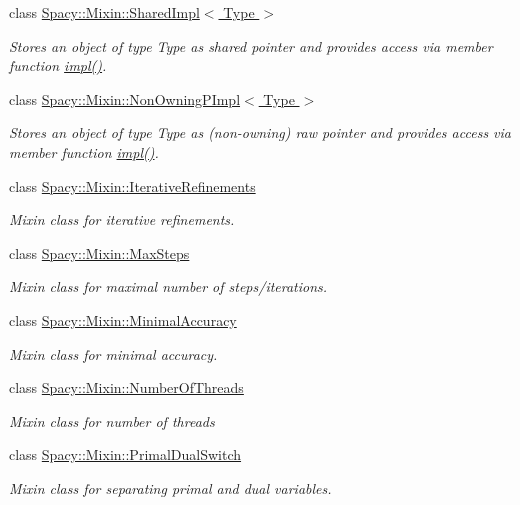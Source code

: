 \begin{DoxyCompactItemize}
class \hyperlink{classSpacy_1_1Mixin_1_1SharedImpl}{Spacy\+::\+Mixin\+::\+Shared\+Impl$<$ Type $>$}
\begin{DoxyCompactList}\small\item\em Stores an object of type Type as shared pointer and provides access via member function \hyperlink{classSpacy_1_1Mixin_1_1SharedImpl_a4bed4faca68901d0dd463c4234fb2fe6}{impl()}. \end{DoxyCompactList}\item 
class \hyperlink{classSpacy_1_1Mixin_1_1NonOwningPImpl}{Spacy\+::\+Mixin\+::\+Non\+Owning\+P\+Impl$<$ Type $>$}
\begin{DoxyCompactList}\small\item\em Stores an object of type Type as (non-\/owning) raw pointer and provides access via member function \hyperlink{classSpacy_1_1Mixin_1_1NonOwningPImpl_aeeb3e0a5f6fd8f22633040dcf94355f9}{impl()}. \end{DoxyCompactList}\item 
class \hyperlink{classSpacy_1_1Mixin_1_1IterativeRefinements}{Spacy\+::\+Mixin\+::\+Iterative\+Refinements}
\begin{DoxyCompactList}\small\item\em Mixin class for iterative refinements. \end{DoxyCompactList}\item 
class \hyperlink{classSpacy_1_1Mixin_1_1MaxSteps}{Spacy\+::\+Mixin\+::\+Max\+Steps}
\begin{DoxyCompactList}\small\item\em Mixin class for maximal number of steps/iterations. \end{DoxyCompactList}\item 
class \hyperlink{classSpacy_1_1Mixin_1_1MinimalAccuracy}{Spacy\+::\+Mixin\+::\+Minimal\+Accuracy}
\begin{DoxyCompactList}\small\item\em Mixin class for minimal accuracy. \end{DoxyCompactList}\item 
class \hyperlink{classSpacy_1_1Mixin_1_1NumberOfThreads}{Spacy\+::\+Mixin\+::\+Number\+Of\+Threads}
\begin{DoxyCompactList}\small\item\em Mixin class for number of threads \end{DoxyCompactList}\item 
class \hyperlink{classSpacy_1_1Mixin_1_1PrimalDualSwitch}{Spacy\+::\+Mixin\+::\+Primal\+Dual\+Switch}
\begin{DoxyCompactList}\small\item\em Mixin class for separating primal and dual variables. \end{DoxyCompactList}\item 

\end{DoxyCompactItemize}
